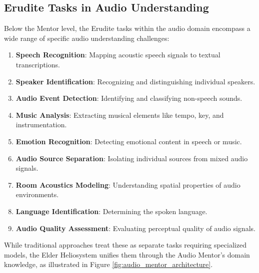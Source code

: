 \subsection{Erudite Tasks in Audio Understanding}

Below the Mentor level, the Erudite tasks within the audio domain encompass a wide range of specific audio understanding challenges:

\begin{enumerate}
    \item \textbf{Speech Recognition}: Mapping acoustic speech signals to textual transcriptions.
    \item \textbf{Speaker Identification}: Recognizing and distinguishing individual speakers.
    \item \textbf{Audio Event Detection}: Identifying and classifying non-speech sounds.
    \item \textbf{Music Analysis}: Extracting musical elements like tempo, key, and instrumentation.
    \item \textbf{Emotion Recognition}: Detecting emotional content in speech or music.
    \item \textbf{Audio Source Separation}: Isolating individual sources from mixed audio signals.
    \item \textbf{Room Acoustics Modeling}: Understanding spatial properties of audio environments.
    \item \textbf{Language Identification}: Determining the spoken language.
    \item \textbf{Audio Quality Assessment}: Evaluating perceptual quality of audio signals.
\end{enumerate}

While traditional approaches treat these as separate tasks requiring specialized models, the Elder Heliosystem unifies them through the Audio Mentor's domain knowledge, as illustrated in Figure \ref{fig:audio_mentor_architecture}.

